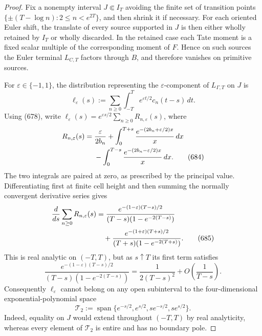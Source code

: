 \documentclass[11pt]{article}
\begin{document}
\begin{proof}
Fix a nonempty interval \(J\Subset I_T\) avoiding the finite set of
transition points \(\{\pm(T-\log n):2\le n<e^{2T}\}\), and then shrink it
if necessary.  For each oriented Euler shift, the translate of every
source supported in \(J\) is then either wholly retained by \(I_T\) or
wholly discarded.  In the retained case each Tate moment is a fixed scalar
multiple of the corresponding moment of \(F\).  Hence on such sources the
Euler terminal \(L_{C,T}\) factors through \(B\), and therefore vanishes on
primitive sources.

For \(\varepsilon\in\{-1,1\}\), the distribution representing the
\(\varepsilon\)-component of \(L_{\Gamma,T}\) on \(J\) is
\[
 \ell_\varepsilon(s)
 :=\sum_{n\ge0}\int_{-T}^{T}
 e^{\varepsilon t/2}c_n(t-s)\,dt .
\]
Using (678), write
\(\ell_\varepsilon(s)=
e^{\varepsilon s/2}\sum_{n\ge0}R_{n,\varepsilon}(s)\), where
\begin{align}
 R_{n,\varepsilon}(s)
 ={}&\frac{\varepsilon}{2b_n}
 +\int_0^{T+s}
   \frac{e^{-(2b_n+\varepsilon/2)x}}{x}\,dx\notag\\
 &-\int_0^{T-s}
   \frac{e^{-(2b_n-\varepsilon/2)x}}{x}\,dx .        \tag{684}
\end{align}
The two integrals are paired at zero, as prescribed by the principal
value.  Differentiating first at finite cell height and then summing the
normally convergent derivative series gives
\begin{align}
 \frac d{ds}\sum_{n\ge0}R_{n,\varepsilon}(s)
 &=
 \frac{e^{-(1-\varepsilon)(T-s)/2}}
 {(T-s)(1-e^{-2(T-s)})}\notag\\
 &\quad+
 \frac{e^{-(1+\varepsilon)(T+s)/2}}
 {(T+s)(1-e^{-2(T+s)})}.                            \tag{685}
\end{align}
This is real analytic on \((-T,T)\), but as \(s\uparrow T\) its first
term satisfies
\begin{equation}
 \frac{e^{-(1-\varepsilon)(T-s)/2}}
 {(T-s)(1-e^{-2(T-s)})}
 =\frac1{2(T-s)^2}+O\!\left(\frac1{T-s}\right).      \tag{686}
\end{equation}
Consequently \(\ell_\varepsilon\) cannot belong on any open subinterval to
the four-dimensional exponential-polynomial space
\begin{equation}
 \mathscr T_2:=
 \operatorname{span}\{
 e^{-s/2},e^{s/2},se^{-s/2},se^{s/2}\}.             \tag{687}
\end{equation}
Indeed, equality on \(J\) would extend throughout \((-T,T)\) by real
analyticity, whereas every element of \(\mathscr T_2\) is entire and has no
boundary pole.


\end{proof}
\end{document}
